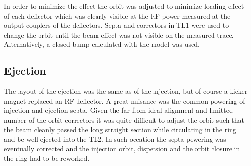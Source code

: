 In order to minimize the effect the orbit was adjusted to minimize loading effect of each deflector
which was clearly visible at the RF power measured at the output couplers of the deflectors.
Septa and correctors in \ac{TL1} were used to change the orbit until the beam effect was not visible on 
the measured trace.
Alternatively, a closed bump calculated with the model was used. 


\subsection{Ejection}

The layout of the ejection was the same as of the injection, 
but of course a kicker magnet replaced an RF deflector.
A great nuisance was the common powering of injection and ejection septa.
Given the far from ideal alignment and limitted number of the orbit correctors
it was quite difficult to adjust the orbit such that 
the beam cleanly passed the long straight section while circulating in the ring
and be well ejected into the TL2. 
In such occation the septa powering was eventually corrected and
the injection orbit, dispersion and the orbit closure in the ring had to be reworked.

















